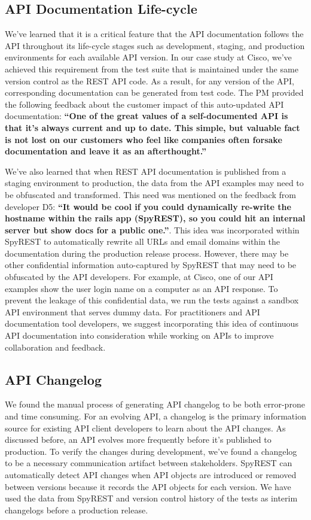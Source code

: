 \documentclass[10pt, conference]{IEEEtran}
\begin{document}
\subsection{API Documentation Life-cycle}
We've learned that it is a critical feature that the API documentation follows the API throughout its life-cycle stages such as development, staging, and production environments for each available API version. In our case study at Cisco, we've achieved this requirement from the test suite that is maintained under the same version control as the REST API code. As a result, for any version of the API, corresponding documentation can be generated from test code. The PM provided the following feedback about the customer impact of this auto-updated API documentation: \textbf{``One of the great values of a self-documented API is that it's always current and up to date. This simple, but valuable fact is not lost on our customers who feel like companies often forsake documentation and leave it as an afterthought.''}

We've also learned that when REST API documentation is published from a staging environment to production, the data from the API examples may need to be obfuscated and transformed. This need was mentioned on the feedback from developer D5: \textbf{``It would be cool if you could dynamically re-write the hostname within the rails app (SpyREST), so you could hit an internal server but show docs for a public one.''}. This idea was incorporated within SpyREST to automatically rewrite all URLs and email domains within the documentation during the production release process. However, there may be other confidential information auto-captured by SpyREST that may need to be obfuscated by the API developers. For example, at Cisco, one of our API examples show the user login name on a computer as an API response. To prevent the leakage of this confidential data, we run the tests against a sandbox API environment that serves dummy data. For practitioners and API documentation tool developers, we suggest incorporating this idea of continuous API documentation into consideration while working on APIs to improve collaboration and feedback.

\subsection{API Changelog}
We found the manual process of generating API changelog to be both error-prone and time consuming. For an evolving API, a changelog is the primary information source for existing API client developers to learn about the API changes. As discussed before, an API evolves more frequently before it's published to production. To verify the changes during development, we've found a changelog to be a necessary communication artifact between stakeholders. SpyREST can automatically detect API changes when API objects are introduced or removed between versions because it records the API objects for each version. We have used the data from SpyREST and version control history of the tests as interim changelogs before a production release.
\end{document}
